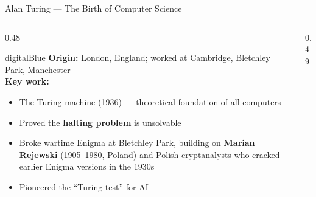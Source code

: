 \begin{frame}[shrink=17]{Alan Turing --- The Birth of Computer Science}

  \begin{columns}[T]
    \begin{column}{0.48\textwidth}
      \begin{personbox}{digitalBlue}
        \textbf{Origin:} London, England; worked at Cambridge, Bletchley Park,
        Manchester\\[3pt]
        \textbf{Key work:}
        \begin{itemize}\setlength\itemsep{1pt}
          \item The \alert{Turing machine} (1936) --- theoretical foundation
                of all computers
          \item Proved the \textbf{halting problem} is unsolvable
          \item Broke wartime Enigma at Bletchley Park, building on
                \textbf{Marian Rejewski} (1905--1980, Poland) and
                Polish cryptanalysts who cracked earlier Enigma versions
                in the 1930s
          \item Pioneered the ``Turing test'' for AI
        \end{itemize}
      \end{personbox}
    \end{column}

    \begin{column}{0.49\textwidth}
    \end{column}
  \end{columns}

\end{frame}

